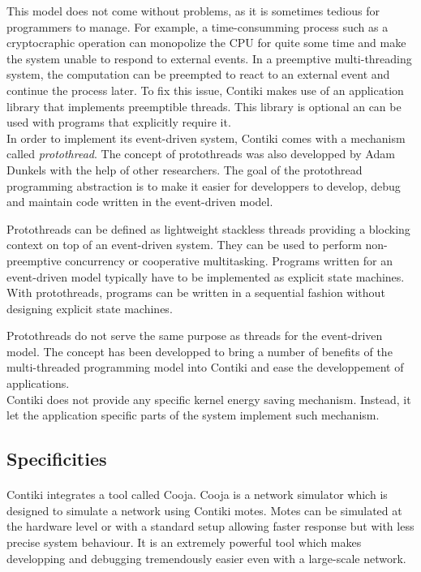 This model does not come without problems, as it is sometimes tedious for programmers to manage.
For example, a time-consumming process such as a cryptocraphic operation can monopolize the CPU for quite some time 
    and make the system unable to respond to external events. 
In a preemptive multi-threading system, the computation can be preempted to react to an external event 
    and continue the process later.
To fix this issue, Contiki makes use of an application library that implements preemptible threads.
This library is optional an can be used with programs that explicitly require it.\\

In order to implement its event-driven system, Contiki comes with a mechanism called \textit{protothread}.
The concept of protothreads was also developped by Adam Dunkels with the help of other researchers.
The goal of the protothread programming abstraction is to make it easier for developpers to develop, debug and maintain code written in the event-driven model.

Protothreads can be defined as lightweight stackless threads providing a blocking context on top of an event-driven system.
They can be used to perform non-preemptive concurrency or cooperative multitasking.
Programs written for an event-driven model typically have to be implemented as explicit state machines.
With protothreads, programs can be written in a sequential fashion without designing explicit state machines.

Protothreads do not serve the same purpose as threads for the event-driven model.
The concept has been developped to bring a number of benefits of the multi-threaded programming model into Contiki
    and ease the developpement of applications.\\

Contiki does not provide any specific kernel energy saving mechanism.
Instead, it let the application specific parts of the system implement such mechanism.

\subsection{Specificities}
\paragraph{}
Contiki integrates a tool called Cooja.
Cooja is a network simulator which is designed to simulate a network using Contiki motes.
Motes can be simulated at the hardware level or with a standard setup allowing faster response but with less precise system behaviour.
It is an extremely powerful tool which makes developping and debugging tremendously easier even with a large-scale network.

